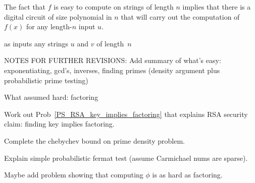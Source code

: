 The fact that $f$ is easy to compute on strings of length $n$ implies
that there is a digital circuit of size polynomial in $n$ that will
carry out the computation of $f(x)$ for any length-$n$ input $u$.

as inputs any strings $u$ and $v$ of length~$n$ \fi

\begin{editingnotes}
NOTES FOR FURTHER REVISIONS:
Add summary of what's easy: exponentiating, gcd's, inverses, finding
primes (density argument plus probabilistic prime testing)

What assumed hard: factoring

Work out Prob~\ref{PS_RSA_key_implies_factoring} that explains RSA security claim: finding
key implies factoring.

Complete the chebychev bound on prime density problem.

Explain simple probabilistic fermat test (assume Carmichael nums are sparse).

Maybe add problem showing that computing $\phi$ is as hard as factoring.
\end{editingnotes}

\endinput

